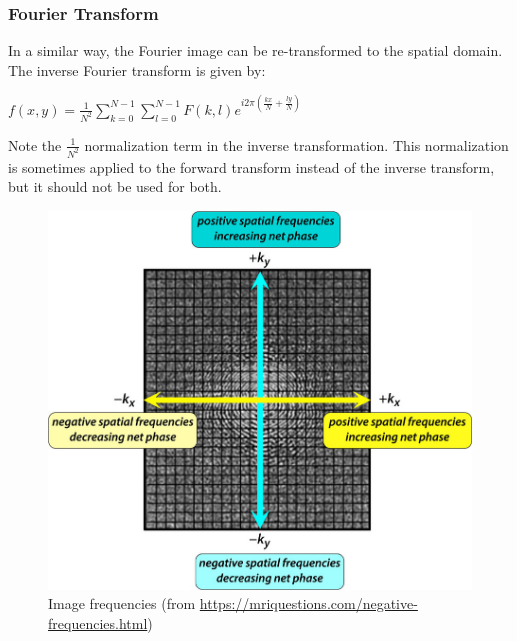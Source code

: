 \begin{frame}
    \frametitle{Fourier Transform}
    In a similar way, the Fourier image can be re-transformed to the spatial domain. The inverse Fourier transform is given by: \newline

    \begin{center}
        $f(x,y) = \frac{1}{N^2} \sum^{N-1}_{k=0} \sum^{N-1}_{l=0}  F(k,l) e^{i 2\pi(\frac{kx}{N}+\frac{ly}{N})}$
    \end{center}

Note the $\frac{1}{N^2}$ normalization term in the inverse transformation. This normalization is sometimes applied to the forward transform instead of the inverse transform, but it should not be used for both.

     \begin{figure}[]
        \centering
        \includegraphics[height=0.5\textheight]{images/kspace.jpg}
        \caption{Image frequencies (from \url{https://mriquestions.com/negative-frequencies.html})}
    \end{figure}
\end{frame}

